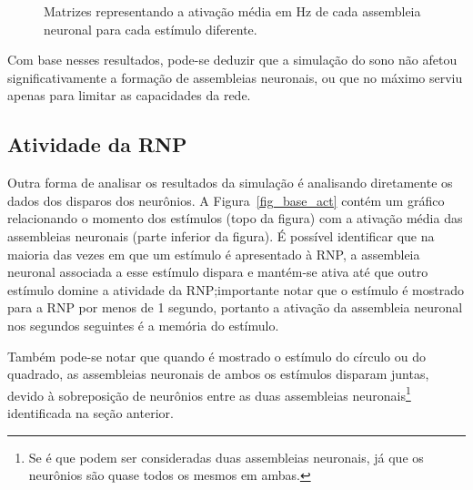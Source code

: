 \begin{figure}[!ht]
\caption{Matrizes representando a ativação média em Hz de cada assembleia neuronal para cada estímulo diferente.}
\end{figure}

Com base nesses resultados, pode-se deduzir que a simulação do sono não afetou significativamente a formação de assembleias
neuronais, ou que no máximo serviu apenas para limitar as capacidades da rede.

\subsection{Atividade da RNP}

Outra forma de analisar os resultados da simulação é analisando diretamente os dados dos disparos dos neurônios. A
Figura~\ref{fig_base_act} contém um gráfico relacionando o momento dos estímulos (topo da figura) com a ativação média das
assembleias neuronais (parte inferior da figura). É possível identificar que na maioria das vezes em que um estímulo é apresentado
à RNP, a assembleia neuronal associada a esse estímulo dispara e mantém-se ativa até que outro estímulo domine a atividade da
RNP; importante notar que o estímulo é mostrado para a RNP por menos de 1 segundo, portanto a ativação da assembleia neuronal
nos segundos seguintes é a memória do estímulo.

Também pode-se notar que quando é mostrado o estímulo do círculo ou do quadrado, as assembleias neuronais de ambos os estímulos
disparam juntas, devido à sobreposição de neurônios entre as duas assembleias neuronais\footnote{Se é que podem ser consideradas
duas assembleias neuronais, já que os neurônios são quase todos os mesmos em ambas.} identificada na seção anterior.


